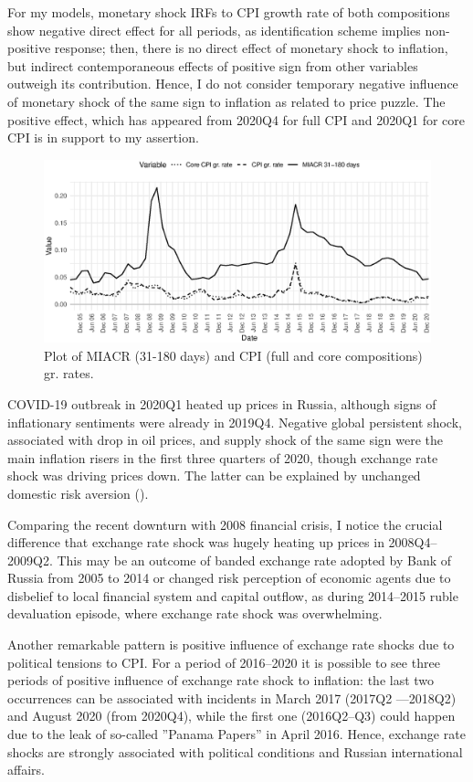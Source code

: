 \documentclass[12pt, a4paper]{extarticle}
\begin{document}
For my models, monetary shock IRFs to CPI growth rate of both compositions show negative direct effect for all periods, as identification scheme implies non-positive response; then, there is no direct effect of monetary shock to inflation, but indirect contemporaneous effects of positive sign from other variables outweigh its contribution. Hence, I do not consider temporary negative influence of monetary shock of the same sign to inflation as related to price puzzle. The positive effect, which has appeared from 2020Q4 for full CPI and 2020Q1 for core CPI is in support to my assertion.

\begin{figure}[h!]
	\centering
	\includegraphics[width=1\linewidth]{figures/intrate_cpi}
	\caption[]{Plot of MIACR (31-180 days) and CPI (full and core compositions) gr. rates.}
	\label{fig:intrate_cpi}
\end{figure}


COVID-19 outbreak in 2020Q1 heated up prices in Russia, although signs of inflationary sentiments were already in 2019Q4. Negative global persistent shock, associated with drop in oil prices, and supply shock of the same sign were the main inflation risers in the first three quarters of 2020, though exchange rate shock was driving prices down. The latter can be explained by unchanged domestic risk aversion (\cite[p. 258]{Forbes2018}).

Comparing the recent downturn with 2008 financial crisis, I notice the crucial difference that exchange rate shock was hugely heating up prices in 2008Q4--2009Q2. This may be an outcome of banded exchange rate adopted by Bank of Russia from 2005 to 2014 or changed risk perception of economic agents due to disbelief to local financial system and capital outflow, as during 2014--2015 ruble devaluation episode, where exchange rate shock was overwhelming.

Another remarkable pattern is positive influence of exchange rate shocks due to political tensions to CPI. For a period of 2016--2020 it is possible to see three periods of positive influence of exchange rate shock to inflation: the last two occurrences can be associated with incidents in March 2017 (2017Q2 ---2018Q2) and August 2020 (from 2020Q4), while the first one (2016Q2--Q3) could happen due to the leak of so-called ''Panama Papers'' in April 2016. Hence, exchange rate shocks are strongly associated with political conditions and Russian international affairs.
\end{document}
